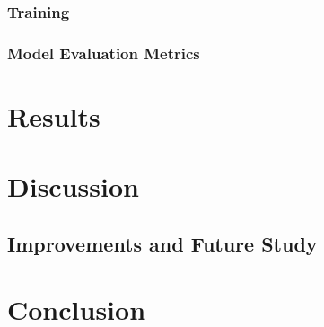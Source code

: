 \documentclass[a4paper,11pt,notitlepage]{article}
\begin{document}

\subsubsection{Training}


\subsubsection{Model Evaluation Metrics}


\newpage

\section{Results}


\section{Discussion}


\subsection{Improvements and Future Study}


\section{Conclusion}


\newpage



\end{document}
